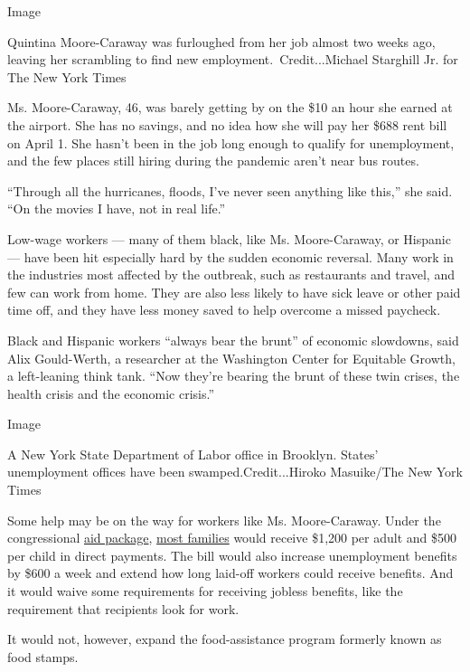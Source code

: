Image

Quintina Moore-Caraway was furloughed from her job almost two weeks ago,
leaving her scrambling to find new employment.~Credit...Michael
Starghill Jr. for The New York Times

Ms. Moore-Caraway, 46, was barely getting by on the \$10 an hour she
earned at the airport. She has no savings, and no idea how she will pay
her \$688 rent bill on April 1. She hasn't been in the job long enough
to qualify for unemployment, and the few places still hiring during the
pandemic aren't near bus routes.

``Through all the hurricanes, floods, I've never seen anything like
this,'' she said. ``On the movies I have, not in real life.''

Low-wage workers --- many of them black, like Ms. Moore-Caraway, or
Hispanic --- have been hit especially hard by the sudden economic
reversal. Many work in the industries most affected by the outbreak,
such as restaurants and travel, and few can work from home. They are
also less likely to have sick leave or other paid time off, and they
have less money saved to help overcome a missed paycheck.

Black and Hispanic workers ``always bear the brunt'' of economic
slowdowns, said Alix Gould-Werth, a researcher at the Washington Center
for Equitable Growth, a left-leaning think tank. ``Now they're bearing
the brunt of these twin crises, the health crisis and the economic
crisis.''

Image

A New York State Department of Labor office in Brooklyn. States'
unemployment offices have been swamped.Credit...Hiroko Masuike/The New
York Times

Some help may be on the way for workers like Ms. Moore-Caraway. Under
the congressional
\href{https://www.nytimes.com/2020/03/25/us/politics/whats-in-coronavirus-stimulus-bill.html?action=click\&module=Spotlight\&pgtype=Homepage}{aid
package},
\href{https://www.nytimes.com/article/coronavirus-stimulus-package-questions-answers.html}{most
families} would receive \$1,200 per adult and \$500 per child in direct
payments. The bill would also increase unemployment benefits by \$600 a
week and extend how long laid-off workers could receive benefits. And it
would waive some requirements for receiving jobless benefits, like the
requirement that recipients look for work.

It would not, however, expand the food-assistance program formerly known
as food stamps.

